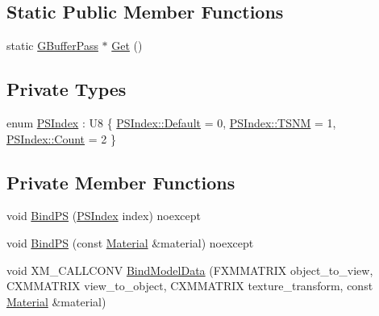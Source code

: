 \subsection*{Static Public Member Functions}
\begin{DoxyCompactItemize}
\item 
static \hyperlink{classmage_1_1_g_buffer_pass}{G\+Buffer\+Pass} $\ast$ \hyperlink{classmage_1_1_g_buffer_pass_ab2a50a7bde900978153badaa49cf047c}{Get} ()
\end{DoxyCompactItemize}
\subsection*{Private Types}
\begin{DoxyCompactItemize}
\item 
enum \hyperlink{classmage_1_1_g_buffer_pass_a23039b6695c10c88676c38fe63123571}{P\+S\+Index} \+: U8 \{ \hyperlink{classmage_1_1_g_buffer_pass_a23039b6695c10c88676c38fe63123571a7a1920d61156abc05a60135aefe8bc67}{P\+S\+Index\+::\+Default} = 0, 
\hyperlink{classmage_1_1_g_buffer_pass_a23039b6695c10c88676c38fe63123571a6e02c9f63944ea221e7d55c11ecae07b}{P\+S\+Index\+::\+T\+S\+NM} = 1, 
\hyperlink{classmage_1_1_g_buffer_pass_a23039b6695c10c88676c38fe63123571ae93f994f01c537c4e2f7d8528c3eb5e9}{P\+S\+Index\+::\+Count} = 2
 \}
\end{DoxyCompactItemize}
\subsection*{Private Member Functions}
\begin{DoxyCompactItemize}
\item 
void \hyperlink{classmage_1_1_g_buffer_pass_a750c27aa6f562b53d62f845ce50e731d}{Bind\+PS} (\hyperlink{classmage_1_1_g_buffer_pass_a23039b6695c10c88676c38fe63123571}{P\+S\+Index} index) noexcept
\item 
void \hyperlink{classmage_1_1_g_buffer_pass_afe16e10cc6d3c7d56d387eb1fe2a66ee}{Bind\+PS} (const \hyperlink{classmage_1_1_material}{Material} \&material) noexcept
\item 
void X\+M\+\_\+\+C\+A\+L\+L\+C\+O\+NV \hyperlink{classmage_1_1_g_buffer_pass_a96175e27751c286737d327a4f26f01dd}{Bind\+Model\+Data} (F\+X\+M\+M\+A\+T\+R\+IX object\+\_\+to\+\_\+view, C\+X\+M\+M\+A\+T\+R\+IX view\+\_\+to\+\_\+object, C\+X\+M\+M\+A\+T\+R\+IX texture\+\_\+transform, const \hyperlink{classmage_1_1_material}{Material} \&material)
\end{DoxyCompactItemize}
